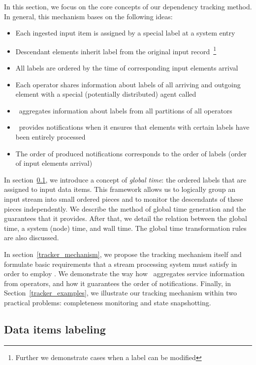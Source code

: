 \label{fs-acker-design}

In this section, we focus on the core concepts of our dependency tracking method. In general, this mechanism bases on the following ideas:
\begin{itemize}
    \item Each ingested input item is assigned by a special label at a system entry
    \item Descendant elements inherit label from the original input record~\footnote{Further we demonstrate cases when a label can be modified}
    \item All labels are ordered by the time of corresponding input elements arrival 
    \item Each operator shares information about labels of all arriving and outgoing element with a special (potentially distributed) agent called {\em \tracker}
    \item \tracker\ aggregates information about labels from all partitions of all operators
    \item \tracker\ provides notifications when it ensures that elements with certain labels have been entirely processed
    \item The order of produced notifications corresponds to the order of labels (order of input elements arrival)
\end{itemize}

In section~\ref{labeling}, we introduce a concept of {\em global time}: the ordered labels that are assigned to input data items. This framework allows us to logically group an input stream into small ordered pieces and to monitor the descendants of these pieces independently. We describe the method of global time generation and the guarantees that it provides. After that, we detail the relation between the global time, a system (node) time, and wall time. The global time transformation rules are also discussed.

In section~\ref{tracker_mechanism}, we propose the tracking mechanism itself and formulate basic requirements that a stream processing system must satisfy in order to employ \tracker . We demonstrate the way how \tracker\ aggregates service information from operators, and how it guarantees the order of notifications. Finally, in Section~\ref{tracker_examples}, we illustrate our tracking mechanism within two practical problems: completeness monitoring and state snapshotting.

\subsection{Data items labeling} \label{labeling}

